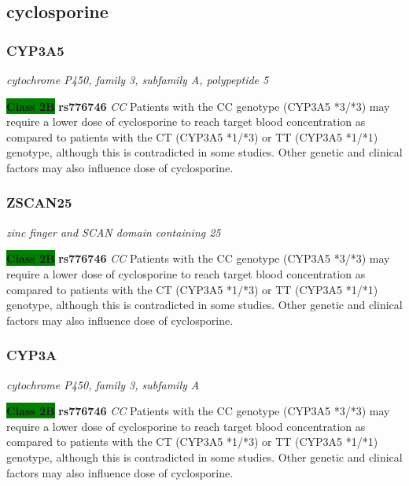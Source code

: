 \documentclass{report}
\begin{document}
\subsection{ cyclosporine }\subsubsection{ CYP3A5 }
\textit{ cytochrome P450, family 3, subfamily A, polypeptide 5 } \newline





\textbf{\colorbox{green} {Class 2B}} \textbf{ rs776746 } \textit{ CC }
Patients with the CC genotype (CYP3A5 *3/*3) may require a lower dose of cyclosporine to reach target blood concentration as compared to patients with the CT (CYP3A5 *1/*3) or TT (CYP3A5 *1/*1) genotype, although this is contradicted in some studies. Other genetic and clinical factors may also influence dose of cyclosporine.\newline\subsubsection{ ZSCAN25 }
\textit{ zinc finger and SCAN domain containing 25 } \newline





\textbf{\colorbox{green} {Class 2B}} \textbf{ rs776746 } \textit{ CC }
Patients with the CC genotype (CYP3A5 *3/*3) may require a lower dose of cyclosporine to reach target blood concentration as compared to patients with the CT (CYP3A5 *1/*3) or TT (CYP3A5 *1/*1) genotype, although this is contradicted in some studies. Other genetic and clinical factors may also influence dose of cyclosporine.\newline\subsubsection{ CYP3A }
\textit{ cytochrome P450, family 3, subfamily A } \newline





\textbf{\colorbox{green} {Class 2B}} \textbf{ rs776746 } \textit{ CC }
Patients with the CC genotype (CYP3A5 *3/*3) may require a lower dose of cyclosporine to reach target blood concentration as compared to patients with the CT (CYP3A5 *1/*3) or TT (CYP3A5 *1/*1) genotype, although this is contradicted in some studies. Other genetic and clinical factors may also influence dose of cyclosporine.\newline
\end{document}
